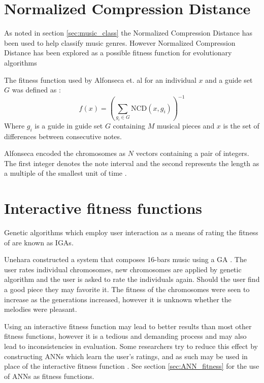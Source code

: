 \section{Normalized Compression Distance} \label{sec:ncdfitness}
As noted in section \ref{sec:music_class} the Normalized Compression Distance has been used to help classify music genres. However Normalized Compression Distance has been explored as a possible fitness function for evolutionary algorithms \cite{Alfonseca2007,Alfonseca:2005:ECM:1981094.1981161,Alfonseca2006}

The fitness function used by Alfonseca et. al for an individual $x$ and a guide set $G$ was defined as \cite{Alfonseca2006}: 
\begin{equation}f(x) = \left( \sum_{g_i\in G} \text{NCD}(x,g_i) \right)^{-1} \label{eq:ncdfitness} \end{equation}
Where $g_i$ is a guide in guide set $G$ containing $M$ musical pieces and $x$ is the set of differences between consecutive notes.

Alfonseca encoded the chromosomes as $N$ vectors containing a pair of integers. The first integer denotes the note interval and the second represents the length as a multiple of the smallest unit of time \cite{Alfonseca2007}.


\section{Interactive fitness functions} \label{sec:iga}
Genetic algorithms which employ user interaction as a means of rating the fitness of are known as \acfp{IGA}.

Unehara constructed a system that composes 16-bars music using a GA \cite{Unehara}. The user rates individual chromosomes, new chromosomes are applied by genetic algorithm and the user is asked to rate the individuals again. Should the user find a good piece they may favorite it. The fitness of the chromosomes were seen to increase as the generations increased, however it is unknown whether the melodies were pleasant.

Using an interactive fitness function may lead to better results than most other fitness functions, however it is a tedious and demanding process and may also lead to inconsistencies in evaluation.
Some researchers try to reduce this effect by constructing \acp{ANN} which learn the user's ratings, and as such may be used in place of the interactive fitness function \cite{Biles1996,Spector_inductionand}. See section \ref{sec:ANN_fitness} for the use of \acp{ANN} as fitness functions.

